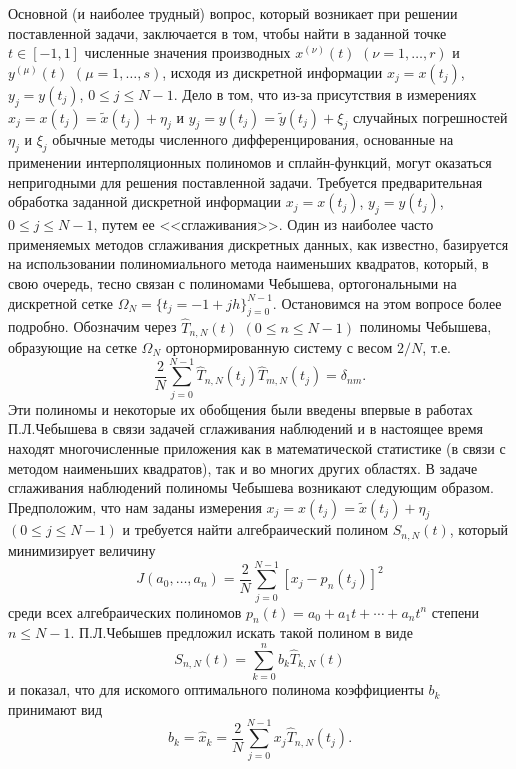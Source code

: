 Основной (и наиболее трудный) вопрос, который возникает при решении поставленной задачи, заключается в том, чтобы найти в заданной точке $t\in[-1,1]$ численные значения производных $x^{(\nu)}(t)$ $(\nu=1,\ldots,r)$ и   $y^{(\mu)}(t)$  $(\mu=1,\ldots,s)$, исходя из дискретной информации $ x_j=x(t_j)$,   $ y_j=y(t_j) $,  $0\le j\le N-1$. Дело в том, что из-за присутствия в измерениях $ x_j=x(t_j)=\tilde x(t_j)+\eta_j$ и  $ y_j=y(t_j)=\tilde y(t_j)+\xi_j $ случайных погрешностей $\eta_j$ и $\xi_j$ обычные методы численного дифференцирования, основанные на применении интерполяционных полиномов и сплайн-функций,  могут оказаться непригодными для решения поставленной задачи. Требуется предварительная обработка заданной дискретной информации $ x_j=x(t_j)$,   $ y_j=y(t_j) $,  $0\le j\le N-1$, путем ее <<сглаживания>>. Один из наиболее часто применяемых методов сглаживания дискретных данных, как известно, базируется на использовании полиномиального метода наименьших квадратов, который, в свою очередь, тесно связан с полиномами Чебышева, ортогональными на дискретной сетке $\Omega_N=\{t_j=-1+jh\}_{j=0}^{N-1}$. Остановимся на этом вопросе более подробно. Обозначим через $\hat T_{n,N}(t)$ $(0\le n\le N-1)$ полиномы Чебышева, образующие на сетке $\Omega_N$ ортонормированную систему с весом $2/N$, т.е.
\begin{equation}\label{idprmeq1.2.21.3}
\frac2N\sum_{j=0}^{N-1}\hat T_{n,N}(t_j)\hat T_{m,N}(t_j)=\delta_{nm}.
\end{equation}
Эти полиномы и некоторые их обобщения были введены впервые в работах П.Л.Чебышева \cite{idprm35,idprm36,idprm37} в  связи задачей сглаживания наблюдений и в настоящее время  находят многочисленные приложения как в математической статистике (в связи с методом наименьших квадратов), так и во многих других областях. В задаче сглаживания наблюдений полиномы Чебышева возникают следующим образом. Предположим, что нам заданы измерения
$x_j=x(t_j)=\tilde x(t_j)+\eta_j$ $(0\le j\le N-1)$  и требуется найти алгебраический полином $S_{n,N}(t)$, который минимизирует величину
$$
J(a_0,\ldots,a_n)=\frac2N\sum_{j=0}^{N-1}[x_j-p_n(t_j)]^2
$$
среди всех алгебраических полиномов $p_n(t)=a_0+a_1t+\cdots+a_nt^n$ степени $n\le N-1$. П.Л.Чебышев предложил искать такой полином в виде
$$
S_{n,N}(t)=\sum_{k=0}^n b_k\hat T_{k,N}(t)
$$
и показал, что для искомого оптимального полинома коэффициенты $b_k$ принимают вид
\begin{equation}\label{idprmeq1.2.21.4}
b_k=\hat x_k=\frac2N\sum_{j=0}^{N-1}x_j\hat T_{n,N}(t_j).
\end{equation}
